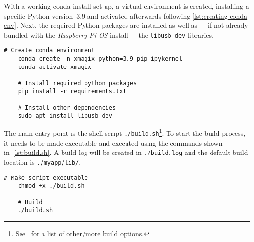             With a working conda install set up, a virtual environment is created, installing a specific Python version~\num{3.9} and activated afterwards following \cref{lst:creating conda env}.
            Next, the required Python packages are installed as well as~--~if not already bundled with the \textit{Raspberry Pi OS} install~--~the \texttt{libusb-dev} libraries.
            \begin{lstlisting}[style=mybash,
                caption={[Creating conda environment and installing dependencies]Creating conda environment and installing dependencies.},
                label={lst:creating conda env}]
    # Create conda environment
    conda create -n xmagix python=3.9 pip ipykernel
    conda activate xmagix

    # Install required python packages
    pip install -r requirements.txt

    # Install other dependencies
    sudo apt install libusb-dev
            \end{lstlisting}

            The main entry point is the shell script \texttt{./build.sh}\footnote{See~\cite{Software.XraythesisHandel.2023} for a list of other/more build options.}.
            To start the build process, it needs to be made executable and executed using the commands shown in~\cref{lst:build.sh}.
            A build log will be created in \texttt{./build.log} and the default build location is \texttt{./myapp/lib/}.
            \begin{lstlisting}[style=mybash, caption={[Executing build script]Executing build script.}, label={lst:build.sh}]
    # Make script executable
    chmod +x ./build.sh

    # Build
    ./build.sh
            \end{lstlisting}
